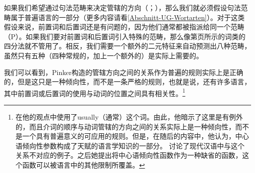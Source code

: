 如果我们希望通过句法范畴来决定管辖的方向（\citealp[]{GW94a}；\citealp[]{Chomsky2005a}），那么我们就必须假设句法范畴属于普遍语言的一部分（更多内容请看\ref{Abschnitt-UG-Wortarten}）。对于这类假设来说，前置词和后置词还是有问题的，因为他们通常都被指派给同一个范畴（P）。如果我们要对前置词和后置词引入特殊的范畴，那么像第\pageref{Tabelle-Merkmalszerlegung-Wortarten}页所示的词类的四分法就不管用了。相反，我们需要一个额外的二元特征来自动预测出八种范畴，虽然只有五种（四种常规的，加上一个额外的）是实际上需要的。

我们可以看到，Pinker构造的管辖方向之间的关系作为普遍的规则实际上是正确的，但是这只是一种倾向性，而不是一条严格的规则，也就是说，还有许多语言，其中前置词或后置词的使用与动词的位置之间具有相关性\citep[]{Dryer92a}。\footnote{%
 \citet[]{Pinker94a}在他的观点中使用了usually（通常）这个词。由此，他暗示了这里是有例外的，而且介词的顺序与动词管辖的方向之间的关系实际上是一种倾向性，而不是一个具有普遍意义的可应用的规则。但是，在随后的内容中，他认为，中心语倾向性参数构成了天赋的语言学知识的一部分。 \citet[]{Travis84a-u}讨论了现代汉语中与这个关系不对应的例子。之后她提出将中心语倾向性函数作为一种缺省的函数，这个函数可以被语言中的其他限制所覆盖。
} 

